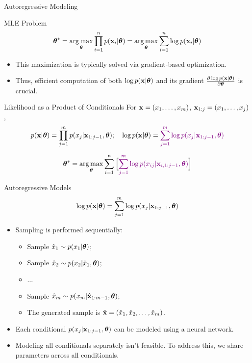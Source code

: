 \documentclass{beamer}
\begin{document}
\begin{frame}{Autoregressive Modeling}
    \begin{block}{MLE Problem}
	    \vspace{-0.4cm}
	    $$
	        \boldsymbol{\theta}^* = \operatorname*{arg\,max}_{\boldsymbol{\theta}} \prod_{i=1}^n p(\mathbf{x}_i | \boldsymbol{\theta}) = \operatorname*{arg\,max}_{\boldsymbol{\theta}} \sum_{i=1}^n \log p(\mathbf{x}_i | \boldsymbol{\theta})
	    $$
	    \vspace{-0.5cm}
    \end{block}
    \begin{itemize}
        \item This maximization is typically solved via gradient-based optimization.
        \item Thus, efficient computation of both $\log p(\mathbf{x} | \boldsymbol{\theta})$ and its gradient $\frac{\partial \log p(\mathbf{x} | \boldsymbol{\theta})}{\partial \boldsymbol{\theta}}$ is crucial.
    \end{itemize}
    \begin{block}{Likelihood as a Product of Conditionals}
    For $\mathbf{x} = (x_1, \dots, x_m)$, $\mathbf{x}_{1:j} = (x_1, \dots, x_j)$,
    $$
        p(\mathbf{x} | \boldsymbol{\theta}) = \prod_{j=1}^m p(x_j | \mathbf{x}_{1:j - 1}, \boldsymbol{\theta});\quad
        \log p(\mathbf{x} | \boldsymbol{\theta}) = {\color{violet}\sum_{j=1}^m \log p(x_j | \mathbf{x}_{1:j - 1}, \boldsymbol{\theta})}
    $$
    \end{block}
    \vspace{-0.5cm}
	 $$
	     \boldsymbol{\theta}^* =  \operatorname*{arg\,max}_{\boldsymbol{\theta}} \sum_{i=1}^n \Big[{\color{violet} \sum_{j=1}^m \log p(x_{ij} | \mathbf{x}_{i, 1:j - 1}, \boldsymbol{\theta})}\Big]
	 $$
\end{frame}
\begin{frame}{Autoregressive Models}
    $$
    \log p(\mathbf{x}| \boldsymbol{\theta}) = \sum_{j=1}^m \log p(x_j | \mathbf{x}_{1:j - 1}, \boldsymbol{\theta})
    $$
    \begin{itemize}
	    \item Sampling is performed sequentially:
	    \begin{itemize}
    		\item Sample $\hat{x}_1 \sim p(x_1 | \boldsymbol{\theta})$;
    		\item Sample $\hat{x}_2 \sim p(x_2 | \hat{x}_1, \boldsymbol{\theta})$;
    		\item $\ldots$
    		\item Sample $\hat{x}_m \sim p(x_m | \hat{\mathbf{x}}_{1:m-1}, \boldsymbol{\theta})$;
    		\item The generated sample is $\hat{\mathbf{x}} = (\hat{x}_1, \hat{x}_2, \ldots, \hat{x}_m)$.
    	\end{itemize}
        \item Each conditional $p(x_j | \mathbf{x}_{1:j - 1}, \boldsymbol{\theta})$ can be modeled using a neural network.
        \item Modeling all conditionals separately isn't feasible. To address this, we share parameters across all conditionals.
    \end{itemize}
\end{frame}
\end{document}
